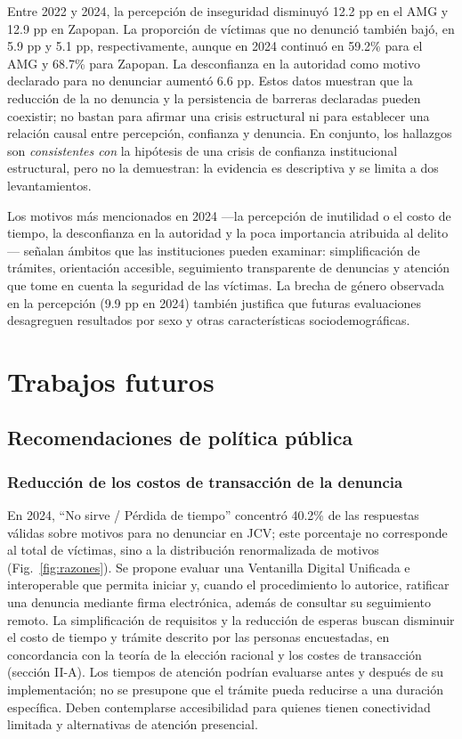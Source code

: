 \documentclass[10pt,twocolumn,letterpaper]{article}
\begin{document}
Entre 2022 y 2024, la percepción de inseguridad disminuyó 12.2 pp en el
AMG y 12.9 pp en Zapopan. La proporción de víctimas que no denunció
también bajó, en 5.9 pp y 5.1 pp, respectivamente, aunque en 2024
continuó en 59.2\% para el AMG y 68.7\% para Zapopan. La desconfianza en
la autoridad como motivo declarado para no denunciar aumentó 6.6 pp.
Estos datos muestran que la reducción de la no denuncia y la persistencia
de barreras declaradas pueden coexistir; no bastan para afirmar una
crisis estructural ni para establecer una relación causal entre
percepción, confianza y denuncia. En conjunto, los hallazgos son
\textit{consistentes con} la hipótesis de una crisis de confianza
institucional estructural, pero no la demuestran: la evidencia es
descriptiva y se limita a dos levantamientos.

Los motivos más mencionados en 2024 —la percepción de inutilidad o el
costo de tiempo, la desconfianza en la autoridad y la poca importancia
atribuida al delito— señalan ámbitos que las instituciones pueden
examinar: simplificación de trámites, orientación accesible, seguimiento
transparente de denuncias y atención que tome en cuenta la seguridad de
las víctimas. La brecha de género observada en la percepción (9.9 pp en
2024) también justifica que futuras evaluaciones desagreguen resultados
por sexo y otras características sociodemográficas.

\section{Trabajos futuros}

\subsection{Recomendaciones de política pública}

\subsubsection{Reducción de los costos de transacción de la denuncia}

En 2024, ``No sirve / Pérdida de tiempo'' concentró 40.2\% de las
respuestas válidas sobre motivos para no denunciar en JCV; este
porcentaje no corresponde al total de víctimas, sino a la distribución
renormalizada de motivos (Fig.~\ref{fig:razones}). Se propone evaluar
una Ventanilla Digital Unificada e interoperable que permita iniciar y,
cuando el procedimiento lo autorice, ratificar una denuncia mediante
firma electrónica, además de consultar su seguimiento remoto. La
simplificación de requisitos y la reducción de esperas buscan disminuir
el costo de tiempo y trámite descrito por las personas encuestadas, en
concordancia con la teoría de la elección racional y los costes de
transacción (sección II-A). Los tiempos de atención podrían evaluarse
antes y después de su implementación; no se presupone que el trámite
pueda reducirse a una duración específica. Deben contemplarse
accesibilidad para quienes tienen conectividad limitada y alternativas
de atención presencial.
\end{document}
